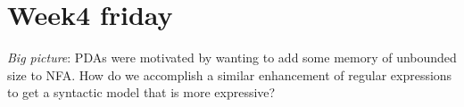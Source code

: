 \documentclass[12pt, oneside]{article}
\begin{document}
\begin{comment}
{\it Extra practice}: Consider the state diagram of a PDA with input alphabet 
$\Sigma$ and stack alphabet $\Gamma$.

\begin{center}
\begin{tabular}{|c|c|}
\hline
Label & means \\
\hline
$a, b ; c$ when $a \in \Sigma$, $b\in \Gamma$, $c \in \Gamma$ 
& \hspace{3in} \\
& \\
& \\
& \\
& \\
&\\
\hline
$a, \varepsilon ; c$ when $a \in \Sigma$, $c \in \Gamma$ 
& \hspace{3in} \\
& \\
& \\
& \\
& \\
&\\
\hline
$a, b ; \varepsilon$ when $a \in \Sigma$, $b\in \Gamma$
& \hspace{3in} \\
& \\
& \\
& \\
& \\
&\\
\hline
$a, \varepsilon ; \varepsilon$ when $a \in \Sigma$
& \hspace{3in} \\
& \\
& \\
& \\
& \\
&\\
\hline
\end{tabular}
\end{center}


How does the meaning change if $a$ is replaced by $\varepsilon$?
\end{comment}
 \vfill
\section*{Week4 friday}



{\it Big picture}: PDAs were motivated by wanting to add some memory of unbounded size to NFA. How 
do we accomplish a similar enhancement of regular expressions to get a syntactic model that is 
more expressive?
\end{document}
